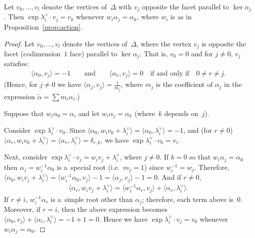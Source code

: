 \begin{Proposition}
\label{prop:dynk}
Let $v_0, \ldots, v_l$ denote the vertices of~$\Delta$ with $v_j$ opposite the facet parallel to $\ker \alpha_j$.
Then $\exp \lambda_i^\vee \cdot v_j = v_k$ whenever $w_i \alpha_j = \alpha_k$, where $w_i$ is as in
Proposition~{\rm \ref{prop:action}}.
\end{Proposition}
\begin{proof}
Let $v_0, \ldots, v_l$ denote the vertices of~$\Delta$, where the vertex $v_j$ is opposite the facet (codimension~$1$
face) parallel to $\ker \alpha_j$.
That is, $v_0=0$ and for $j\neq 0$, $v_j$ satisf\/ies:
\begin{gather*}
\langle \alpha_0,v_j\rangle = -1
\qquad
\text{and}
\qquad
\langle\alpha_r,v_j\rangle = 0
\quad
\text{if and only if}
\quad
0\neq r\neq j.
\end{gather*}
(Hence, for $j\neq 0$ we have $\langle\alpha_j,v_j\rangle = \frac{1}{m_j}$, where $m_j$ is the coef\/f\/icient of $\alpha_j$
in the expression $\tilde\alpha = \sum m_i\alpha_i$.)

Suppose that $w_i\alpha_0 = \alpha_i$ and let $w_i\alpha_j=\alpha_k$ (where~$k$ depends on~$j$).

Consider $\exp \lambda_i^\vee \cdot v_0$.
Since $\langle \alpha_0,w_i v_0+\lambda_i^\vee\rangle = \langle\alpha_0,\lambda_i^\vee\rangle = -1$, and (for $r\neq 0$)
$\langle \alpha_r,w_iv_0 +\lambda_i^\vee\rangle=\langle\alpha_r,\lambda_i^\vee\rangle = \delta_{r,k}$, we have $\exp
\lambda_i^\vee \cdot v_0 = v_i$.

Next, consider $\exp \lambda_i^\vee \cdot v_j=w_i v_j + \lambda_i^\vee$, where $j\neq 0$.
If $k=0$ so that $w_i\alpha_j=\alpha_0$ then $\alpha_j=w_i^{-1} \alpha_0$ is a~special root (i.e.~$m_j=1$) since
$w_i^{-1}=w_j$.
Therefore, $\langle\alpha_0,w_i v_j+\lambda_i^\vee\rangle = \langle w_i^{-1}\alpha_0,v_j\rangle-1= \langle
\alpha_j,v_j\rangle-1=0$.
And if $r\neq 0$,
\begin{gather}
\label{eq:idvert}
\langle\alpha_r,w_i v_j+\lambda_i^\vee\rangle = \langle w_i^{-1} \alpha_r,v_j\rangle + \langle
\alpha_r,\lambda_i^\vee\rangle.
\end{gather}
If $r\neq i$, $w_i^{-1} \alpha_r$ is a~simple root other than $\alpha_j$; therefore, each term above is~$0$.
Moreover, if $r=i$, then the above expression becomes $\langle \alpha_0,v_j \rangle +
\langle\alpha_i,\lambda_i^\vee\rangle = -1+1=0$.
Hence we have $\exp \lambda_i^\vee \cdot v_j = v_0$ whenever $w_i\alpha_j = \alpha_0$.


\end{proof}
